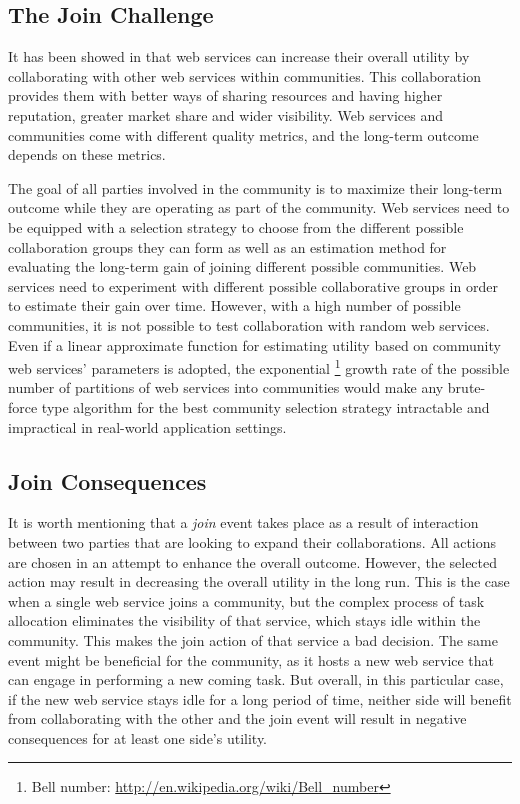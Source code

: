 \documentclass[11pt,onecolumn]{IEEEtran}
\begin{document}
\subsection{The Join Challenge}\label{s:tjc} 
It has been showed in \cite{10.1109/ARES.2008.7,10.1109/TSC.2012.12,10.1109/TSC.2014.2312940} that web services can increase their overall utility by collaborating with other web services within communities. This collaboration provides them with better ways of sharing resources and having higher reputation, greater market share and wider visibility. Web services and communities come with different quality metrics, and the long-term outcome depends on these metrics. 

The goal of all parties involved in the community is to maximize their long-term outcome while they are operating as part of the community. Web services need to be equipped with a selection strategy to choose from the different possible collaboration groups they can form as well as an estimation method for evaluating the long-term gain of joining different possible communities. Web services need to experiment with different possible collaborative groups in order to estimate their gain over time. However, with a high number of possible communities, it is not possible to test collaboration with random web services. Even if a linear approximate function for estimating utility based on community web services' parameters is adopted, the exponential \footnote{Bell number: \url{http://en.wikipedia.org/wiki/Bell\_number}} growth rate of the possible number of partitions of web services into communities would make any brute-force type algorithm for the best community selection strategy intractable and impractical in real-world application settings.

\subsection{Join Consequences}\label{s:jc}
It is worth mentioning that a \emph{join} event takes place as a result of interaction between two parties that are looking to expand their collaborations. All actions are chosen in an attempt to enhance the overall outcome. However, the selected action may result in decreasing the overall utility in the long run. 
This is the case when a single web service joins a community, but the complex process of task allocation eliminates the visibility of that service, which stays idle within the community. This makes the join action of that service a bad decision. The same event might be beneficial for the community, as it hosts a new web service that can engage in performing a new coming task. But overall, in this particular case, if the new web service stays idle for a long period of time, neither side will benefit from collaborating with the other and the join event will result in negative consequences for at least one side's utility. 
\end{document}
